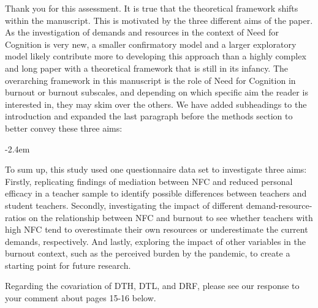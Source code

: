 \documentclass[draft]{article}
\renewenvironment{quote}{\begin{fquote}\advance\leftmargini -2.4em\begin{oldquote}}{\end{oldquote}\end{fquote}}
\newenvironment{fquote}
  {\def\FrameCommand{
	\fboxsep=0.6em %
	\fcolorbox{black}{white}}%
    \MakeFramed {\advance\hsize-2\width \FrameRestore}
    \begin{minipage}{\linewidth}
  }
  {\end{minipage}\endMakeFramed}
\begin{document}

Thank you for this assessment.
It is true that the theoretical framework shifts within the manuscript.
This is motivated by the three different aims of the paper.
As the investigation of demands and resources in the context of Need for Cognition is very new, a smaller confirmatory model and a larger exploratory model likely contribute more to developing this approach than a highly complex and long paper with a theoretical framework that is still in its infancy.
The overarching framework in this manuscript is the role of Need for Cognition in burnout or burnout subscales, and depending on which specific aim the reader is interested in, they may skim over the others.
We have added subheadings to the introduction and expanded the last paragraph before the methods section to better convey these three aims:

\begin{quote}
To sum up, this study used one questionnaire data set to investigate three aims: Firstly, replicating findings of mediation between NFC and reduced personal efficacy in a teacher sample to identify possible differences between teachers and student teachers. Secondly, investigating the impact of different demand-resource-ratios on the relationship between NFC and burnout to see whether teachers with high NFC tend to overestimate their own resources or underestimate the current demands, respectively. And lastly, exploring the impact of other variables in the burnout context, such as the perceived burden by the pandemic, to create a starting point for future research.
\end{quote}

Regarding the covariation of DTH, DTL, and DRF, please see our response to your comment about pages 15-16 below.

\end{document}

